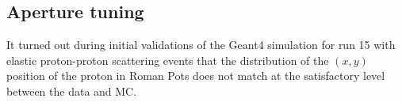 \subsection{Aperture tuning}

It turned out during initial validations of the Geant4 simulation for run 15 with elastic proton-proton scattering events that the distribution of the $(x,y)$ position of the proton in Roman Pots does not match at the satisfactory level between the data and MC. 

\begin{figure}[hb!]%
	\centering
	\parbox{0.4725\textwidth}{
		\centering
		\begin{subfigure}[b]{\linewidth}{
				}
		\end{subfigure}\\%
		\begin{subfigure}[b]{\linewidth}\addtocounter{subfigure}{1}{
}
\end{subfigure}}
\end{figure}
